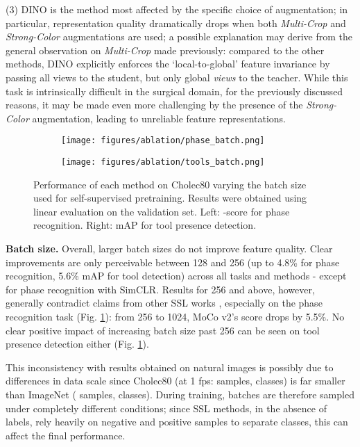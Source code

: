 \documentclass[times,twocolumn,final]{elsarticle}
\begin{document}
(3) DINO is the method most affected by the specific choice of augmentation; in particular, representation quality dramatically drops when both \textit{Multi-Crop} and \textit{Strong-Color} augmentations are used; a possible explanation may derive from the general observation on \textit{Multi-Crop} made previously: compared to the other methods, DINO explicitly enforces the `local-to-global' feature invariance by passing all views to the student, but only global \textit{views} to the teacher. While this task is intrinsically difficult in the surgical domain, for the previously discussed reasons, it may be made even more challenging by the presence of the \textit{Strong-Color} augmentation, leading to unreliable feature representations.
\\
\begin{figure}[h!]
  \begin{subfigure}
    \centering
    \texttt{[image: figures/ablation/phase\_batch.png]}
  \end{subfigure}
  \begin{subfigure}
    \centering
    \texttt{[image: figures/ablation/tools\_batch.png]}  
  \end{subfigure}
  \caption{Performance of each method on Cholec80 varying the batch size used for self-supervised pretraining. Results were obtained using linear evaluation on the validation set. Left: -score for phase recognition. Right: mAP for tool presence detection.}
  \label{fig:abl_batch}
\end{figure}

\noindent\textbf{Batch size. } Overall, larger batch sizes do not improve feature quality. Clear improvements are only perceivable between 128 and 256 (up to 4.8\%  for phase recognition, 5.6\% mAP for tool detection) across all tasks and methods - except for phase recognition with SimCLR. Results for 256 and above, however, generally contradict claims from other SSL works \citep{chen2020simple, caron2020unsupervised, caron2021emerging}, especially on the phase recognition task (Fig. \ref{fig:abl_batch}): from 256 to 1024, MoCo v2's  score drops by 5.5\%. No clear positive impact of increasing batch size past 256 can be seen on tool presence detection either (Fig. \ref{fig:abl_batch}).

This inconsistency with results obtained on natural images is possibly due to differences in data scale since Cholec80 (at 1 fps:  samples,  classes) is far smaller than ImageNet ( samples,  classes). During training, batches are therefore sampled under completely different conditions; since SSL methods, in the absence of labels, rely heavily on negative and positive samples to separate classes, this can affect the final performance. 
\end{document}
